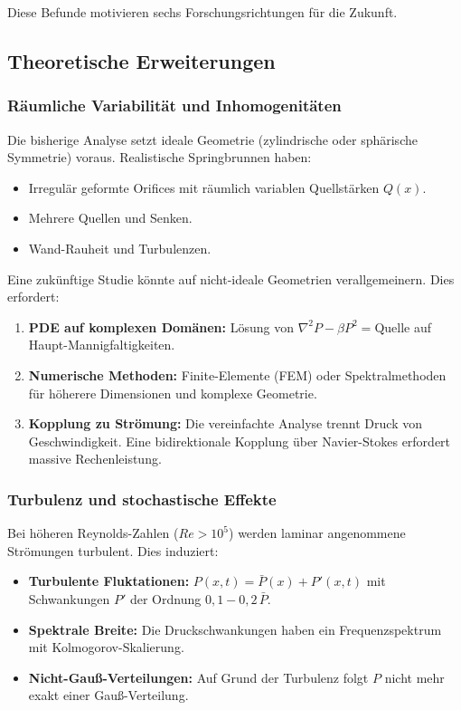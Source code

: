 \documentclass[a4paper,12pt]{article}
\theoremstyle{definition}
\begin{document}
Diese Befunde motivieren sechs Forschungsrichtungen für die Zukunft.

\subsection{Theoretische Erweiterungen}

\subsubsection{Räumliche Variabilität und Inhomogenitäten}

Die bisherige Analyse setzt ideale Geometrie (zylindrische oder sphärische Symmetrie) voraus. Realistische Springbrunnen haben:

\begin{itemize}
	\item Irregulär geformte Orifices mit räumlich variablen Quellstärken $Q(x)$.
	\item Mehrere Quellen und Senken.
	\item Wand-Rauheit und Turbulenzen.
\end{itemize}

Eine zukünftige Studie könnte auf nicht-ideale Geometrien verallgemeinern. Dies erfordert:

\begin{enumerate}
	\item \textbf{PDE auf komplexen Domänen:} Lösung von $\nabla^2 P - \beta P^2 = \text{Quelle}$ auf Haupt-Mannigfaltigkeiten.
	\item \textbf{Numerische Methoden:} Finite-Elemente (FEM) oder Spektralmethoden für höherere Dimensionen und komplexe Geometrie.
	\item \textbf{Kopplung zu Strömung:} Die vereinfachte Analyse trennt Druck von Geschwindigkeit. Eine bidirektionale Kopplung über Navier-Stokes erfordert massive Rechenleistung.
\end{enumerate}

\subsubsection{Turbulenz und stochastische Effekte}

Bei höheren Reynolds-Zahlen ($Re > 10^5$) werden laminar angenommene Strömungen turbulent. Dies induziert:

\begin{itemize}
	\item \textbf{Turbulente Fluktationen:} $P(x,t) = \bar{P}(x) + P'(x,t)$ mit Schwankungen $P'$ der Ordnung $0{,}1 - 0{,}2 \, \bar{P}$.
	\item \textbf{Spektrale Breite:} Die Druckschwankungen haben ein Frequenzspektrum mit Kolmogorov-Skalierung.
	\item \textbf{Nicht-Gauß-Verteilungen:} Auf Grund der Turbulenz folgt $P$ nicht mehr exakt einer Gauß-Verteilung.
\end{itemize}
\end{document}
